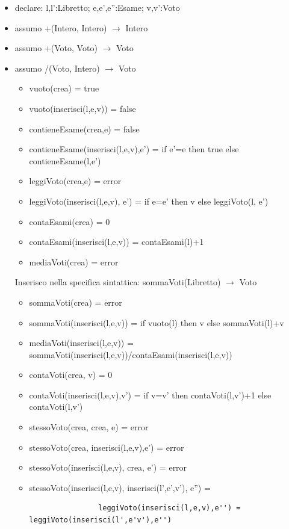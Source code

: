 \documentclass{article}
\begin{document}
	\begin{itemize}
		\item declare: l,l':Libretto; e,e',e'':Esame; v,v':Voto 
		\item assumo +(Intero, Intero) $\rightarrow$ Intero
		\item assumo +(Voto, Voto) $\rightarrow$ Voto
		\item assumo /(Voto, Intero) $\rightarrow$ Voto
		\begin{itemize}
			\item vuoto(crea) = true
			\item vuoto(inserisci(l,e,v)) = false
			\item contieneEsame(crea,e) = false
			\item contieneEsame(inserisci(l,e,v),e') = if e'=e then true else contieneEsame(l,e')
			\item leggiVoto(crea,e) = error
			\item leggiVoto(inserisci(l,e,v), e') = if e=e' then v else leggiVoto(l, e') \\
			\item contaEsami(crea) = 0
			\item contaEsami(inserisci(l,e,v)) = contaEsami(l)+1
			\item mediaVoti(crea) = error
		\end{itemize}
		Inserisco nella specifica sintattica: sommaVoti(Libretto) $\rightarrow$ Voto
		\begin{itemize}
			\item sommaVoti(crea) = error
			\item sommaVoti(inserisci(l,e,v)) = if vuoto(l) then v else sommaVoti(l)+v
			\item mediaVoti(inserisci(l,e,v)) = sommaVoti(inserisci(l,e,v))/contaEsami(inserisci(l,e,v))
			\item contaVoti(crea, v) = 0
			\item contaVoti(inserisci(l,e,v),v') = if v=v' then contaVoti(l,v')+1 else contaVoti(l,v')
			\item stessoVoto(crea, crea, e) = error
			\item stessoVoto(crea, inserisci(l,e,v),e') = error
			\item stessoVoto(inserisci(l,e,v), crea, e') = error
			\item stessoVoto(inserisci(l,e,v), inserisci(l',e',v'), e'') = 
			\begin{verbatim}
				leggiVoto(inserisci(l,e,v),e'') = leggiVoto(inserisci(l',e'v'),e'')
			\end{verbatim}
		\end{itemize}
	\end{itemize}
	\newpage
\end{document}
